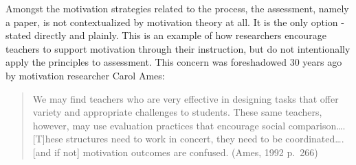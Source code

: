 \documentclass[
]{book}
\begin{document}
Amongst the motivation strategies related to the process, the assessment, namely a paper, is not contextualized by motivation theory at all. It is the only option - stated directly and plainly. This is an example of how researchers encourage teachers to support motivation through their instruction, but do not intentionally apply the principles to assessment. This concern was foreshadowed 30 years ago by motivation researcher Carol Ames:

\begin{quote}
We may find teachers who are very effective in designing tasks that offer variety and appropriate challenges to students. These same teachers, however, may use evaluation practices that encourage social comparison\ldots. {[}T{]}hese structures need to work in concert, they need to be coordinated\ldots. {[}and if not{]} motivation outcomes are confused. (Ames, 1992 p.~266)
\end{quote}
\end{document}
